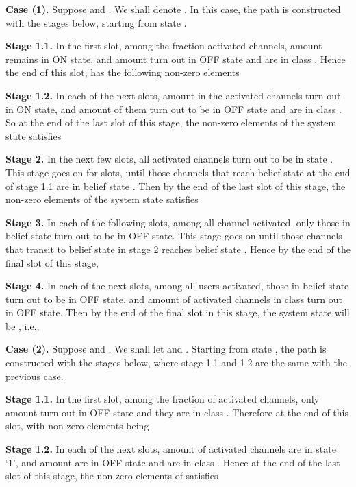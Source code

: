 \documentclass[11pt,twocolumn]{IEEEtran}
\begin{document}
\noindent \textbf{Case (1). }Suppose  and . We shall denote . In this case,
the path is constructed with the stages below, starting from state .
\vspace{7pt}

\noindent\textbf{Stage 1.1.} In the first slot, among the  fraction activated channels,  amount remains in ON state, and  amount turn out in OFF state and are in class . Hence the end of this slot,  has the following non-zero elements


\noindent\textbf{Stage 1.2.} In each of the next  slots,  amount in the activated channels turn out in ON state, and  amount of them turn out to be in OFF state and are in class . So at the end of the last slot of this stage, the non-zero elements of the system state  satisfies


\noindent\textbf{Stage 2.} In the next few slots, all activated channels turn out to be in state . This stage goes on for  slots, until those channels that reach belief state  at the end of stage 1.1 are in belief state . Then by the end of the last slot of this stage, the non-zero elements of the system state  satisfies


\noindent\textbf{Stage 3.} In each of the following slots, among all channel activated, only those in belief state   turn out to be in OFF state. This stage goes on until those channels that transit to belief state  in stage 2 reaches belief state . Hence by the end of the final slot of this stage,


\noindent\textbf{Stage 4.} In each of the next  slots, among all users activated, those in belief state   turn out to be in OFF state, and  amount of activated channels in class  turn out in OFF state.
Then by the end of the final slot in this stage, the system state will be , i.e.,

\vspace{2pt}

\noindent \textbf{Case (2).} Suppose  and . We shall let  and . Starting from state , the path is constructed with the stages below, where stage 1.1 and 1.2 are the same with the previous case.
\hspace{10pt}

\noindent\textbf{Stage 1.1.} In the first slot, among the  fraction of activated channels, only  amount turn out in OFF state and they are in class . Therefore at the end of this slot,  with non-zero elements being


\noindent\textbf{Stage 1.2.} In each of the next  slots,  amount of activated channels are in state `1', and  amount are in OFF state and are in class . Hence at the end of the last slot of this stage, the non-zero elements of  satisfies
\end{document}
